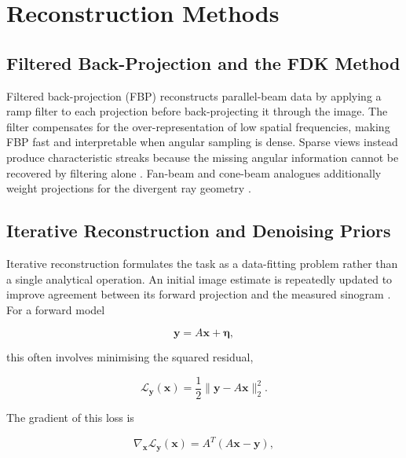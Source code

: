 \section{Reconstruction Methods}
\label{sec:reconstruction_methods}

\subsection{Filtered Back-Projection and the FDK Method}
\label{subsec:fbp_fdk}

Filtered back-projection (FBP) reconstructs parallel-beam data by applying a ramp filter to each projection before back-projecting it through the image. The filter compensates for the over-representation of low spatial frequencies, making FBP fast and interpretable when angular sampling is dense. Sparse views instead produce characteristic streaks because the missing angular information cannot be recovered by filtering alone \cite{sidky_accurate_2006,jin_bone-induced_2012}. Fan-beam and cone-beam analogues additionally weight projections for the divergent ray geometry \cite{feldkamp_practical_1984}.

\subsection{Iterative Reconstruction and Denoising Priors}
\label{subsec:iterative_reconstruction_denoising_priors}

Iterative reconstruction formulates the task as a data-fitting problem rather than a single analytical operation. An initial image estimate is repeatedly updated to improve agreement between its forward projection and the measured sinogram \cite{beck_fast_2009}. For a forward model

\begin{equation}
\mathbf{y}=A\mathbf{x}+\boldsymbol{\eta},
\label{eq:iterative_forward_model}
\end{equation}

this often involves minimising the squared residual,

\begin{equation}
\mathcal{L}_{\mathbf{y}}(\mathbf{x})
=
\frac{1}{2}
\|\mathbf{y}-A\mathbf{x}\|_2^2.
\label{eq:data_loss}
\end{equation}

The gradient of this loss is

\begin{equation}
\nabla_{\mathbf{x}}\mathcal{L}_{\mathbf{y}}(\mathbf{x})
=
A^T(A\mathbf{x}-\mathbf{y}),
\label{eq:data_loss_gradient}
\end{equation}

